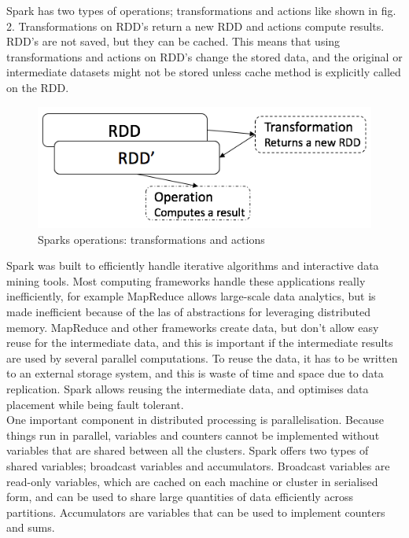 \documentclass{article}
\theoremstyle{definition}
\begin{document}
Spark has two types of operations; transformations and actions like shown in fig. 2. Transformations on RDD's return a new RDD and actions compute results. RDD's are not saved, but they can be cached. This means that using transformations and actions on RDD's change the stored data, and the original or intermediate datasets might not be stored unless cache method is explicitly called on the RDD.\\

\begin{figure}[H]
\centering
\includegraphics[scale=0.5]{RDD}
\caption{Sparks operations: transformations and actions}
\end{figure}

Spark was built to efficiently handle iterative algorithms and interactive data mining tools. Most computing frameworks handle these applications really inefficiently, for example MapReduce allows large-scale data analytics, but is made inefficient because of the las of abstractions for leveraging distributed memory. MapReduce and other frameworks create data, but don't allow easy reuse for the intermediate data, and this is important if the intermediate results are used by several parallel computations. To reuse the data, it has to be written to an external storage system, and this is waste of time and space due to data replication. Spark allows reusing the intermediate data, and optimises data placement while being fault tolerant. \\ 

One important component in distributed processing is parallelisation. Because things run in parallel, variables and counters cannot be implemented without variables that are shared between all the clusters. Spark offers two types of shared variables; broadcast variables and accumulators. Broadcast variables are read-only variables, which are cached on each machine or cluster in serialised form, and can be used to share large quantities of data efficiently across partitions. Accumulators are variables that can be used to implement counters and sums. \\ 
\end{document}
